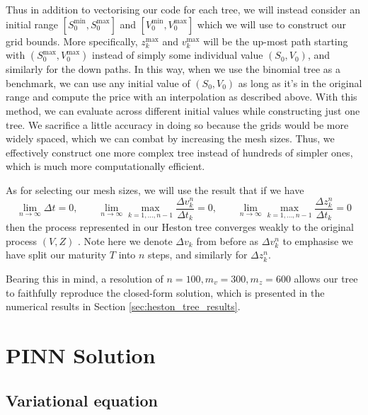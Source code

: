 Thus in addition to vectorising our code for each tree, we will instead consider an initial range $[S_0^\text{min}, S_0^\text{max}]$ and $[V_0^\text{min}, V_0^\text{max}]$ which we will use to construct our grid bounds. More specifically, $z_k^\text{max}$ and $v_k^\text{max}$ will be the up-most path starting with $(S_0^\text{max}, V_0^\text{max})$ instead of simply some individual value $(S_0, V_0)$, and similarly for the down paths. In this way, when we use the binomial tree as a benchmark, we can use any initial value of $(S_0, V_0)$ as long as it's in the original range and compute the price with an interpolation as described above. With this method, we can evaluate across different initial values while constructing just one tree. We sacrifice a little accuracy in doing so because the grids would be more widely spaced, which we can combat by increasing the mesh sizes. Thus, we effectively construct one more complex tree instead of hundreds of simpler ones, which is much more computationally efficient.

As for selecting our mesh sizes, we will use the result that if we have
\begin{equation}
    \lim _{n \to \infty} \Delta t = 0, \qquad \lim _{n \to \infty}\max_{k=1, \dots, n-1} \frac{\Delta v^n_k}{\Delta t_k} = 0, \qquad \lim _{n \to \infty}\max_{k=1, \dots, n-1} \frac{\Delta z^n_k}{\Delta t_k} = 0
\end{equation}
then the process represented in our Heston tree converges weakly to the original process $(V, Z)$ \cite{vellekoop2009tree}. Note here we denote $\Delta v_k$ from before as $\Delta v_k^n$ to emphasise we have split our maturity $T$ into $n$ steps, and similarly for $\Delta z_k^n$.

Bearing this in mind, a resolution of $n=100, m_v=300, m_z=600$ allows our tree to faithfully reproduce the closed-form solution, which is presented in the numerical results in Section \ref{sec:heston_tree_results}.

\section{PINN Solution}

\subsection{Variational equation}
\label{sec:heston_variation_equation}

